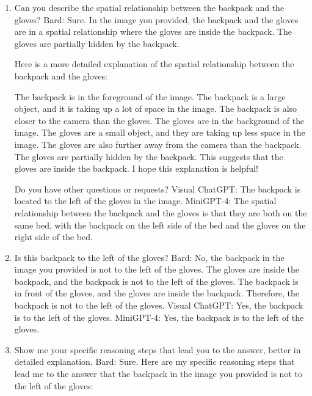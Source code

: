 \begin{enumerate}
    \item Can you describe the spatial relationship between the backpack and the gloves?
    \subitem Bard: Sure. In the image you provided, the backpack and the gloves are in a spatial relationship where the gloves are inside the backpack. The gloves are partially hidden by the backpack.

    Here is a more detailed explanation of the spatial relationship between the backpack and the gloves:
    
    The backpack is in the foreground of the image. The backpack is a large object, and it is taking up a lot of space in the image. The backpack is also closer to the camera than the gloves.
    The gloves are in the background of the image. The gloves are a small object, and they are taking up less space in the image. The gloves are also further away from the camera than the backpack.
    The gloves are partially hidden by the backpack. This suggests that the gloves are inside the backpack.
    I hope this explanation is helpful!
    
    Do you have other questions or requests?
    \subitem Visual ChatGPT: The backpack is located to the left of the gloves in the image.
    \subitem MiniGPT-4: The spatial relationship between the backpack and the gloves is that they are both on the same bed, with the backpack on the left side of the bed and the gloves on the right side of the bed.
    \item Is this backpack to the left of the gloves?
    \subitem Bard: 
    No, the backpack in the image you provided is not to the left of the gloves. The gloves are inside the backpack, and the backpack is not to the left of the gloves. The backpack is in front of the gloves, and the gloves are inside the backpack. Therefore, the backpack is not to the left of the gloves.
    \subitem Visual ChatGPT: Yes, the backpack is to the left of the gloves.
    \subitem MiniGPT-4: Yes, the backpack is to the left of the gloves.
    \item Show me your specific reasoning steps that lead you to the answer, better in detailed explanation.
    \subitem Bard: 
    Sure. Here are my specific reasoning steps that lead me to the answer that the backpack in the image you provided is not to the left of the gloves:


\end{enumerate}

